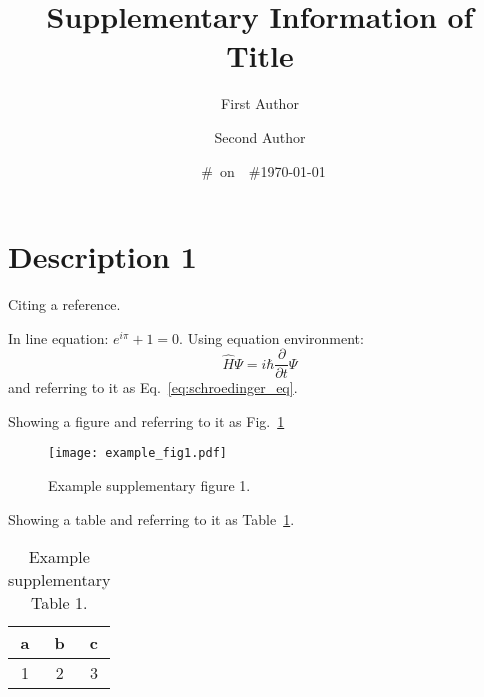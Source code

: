 \documentclass[aps,prl,twocolumn,superscriptaddress,showpacs]{revtex4-2}
\begin{document}
\ifdefined\GITHASH
    \ifdefined\GITDATE
        \ifdefined\GITBRANCH
            \date{\GITDATE\ \#\GITHASH\ on\ \GITBRANCH}
        \else
            \date{\GITDATE\ \#\GITHASH}
        \fi
    \fi
\else
    \date{\today}
\fi

\title{Supplementary Information of Title}
\author{First Author}
\author{Second Author}

\renewcommand{\thepage}{S\arabic{page}}
\renewcommand{\thefigure}{S\arabic{figure}}
\renewcommand{\thetable}{S\arabic{table}}
\renewcommand{\theequation}{S\arabic{equation}}

\flushbottom
\maketitle

\thispagestyle{empty}

\section*{Description 1}
Citing a reference\cite{example}.

In line equation: $e^{i\pi} + 1 = 0$.
Using equation environment:
\begin{equation}
    \hat{H}\Psi = i\hbar\frac{\partial}{\partial t}\Psi
    \label{eq:schroedinger_eq}
\end{equation}
and referring to it as Eq.~\ref{eq:schroedinger_eq}.

Showing a figure and referring to it as Fig.~\ref{fig:example_fig1}
\begin{figure}
    \caption{
    Example supplementary figure 1.
    }
    \label{fig:example_fig1}
    \texttt{[image: example\_fig1.pdf]}
\end{figure}

Showing a table and referring to it as Table~\ref{table:example_table1}.
\begin{table}
    \caption{
        Example supplementary Table 1.
    }
    \label{table:example_table1}
    \centering
    \begin{tabular}{ccc}
       a & b & c \\
       \hline
       1 & 2 & 3 \\
    \end{tabular}
\end{table}


\end{document}
